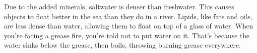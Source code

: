 Due to the added minerals, saltwater is denser than freshwater. This causes objects to float
better in the sea than they do in a river. Lipids, like fats and
oils, are less dense than water, allowing them to float on top of a glass of water.
When you're facing a grease fire, you're told not to put water on it. That's because
the water sinks below the grease, then boils, throwing burning grease everywhere.

